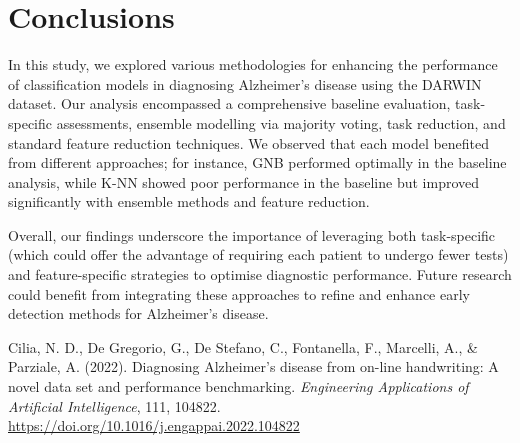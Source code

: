 \documentclass[a4paper, 11pt]{article}
\begin{document}
\section{Conclusions}
In this study, we explored various methodologies for enhancing the performance of classification models in diagnosing Alzheimer's disease using the DARWIN dataset. Our analysis encompassed a comprehensive baseline evaluation, task-specific assessments, ensemble modelling via majority voting, task reduction, and standard feature reduction techniques. We observed that each model benefited from different approaches; for instance, GNB performed optimally in the baseline analysis, while K-NN showed poor performance in the baseline but improved significantly with ensemble methods and feature reduction.

Overall, our findings underscore the importance of leveraging both task-specific (which could offer the advantage of requiring each patient to undergo fewer tests) and feature-specific strategies to optimise diagnostic performance.  Future research could benefit from integrating these approaches to refine and enhance early detection methods for Alzheimer's disease.

\begin{thebibliography}{99}
Cilia, N. D., De Gregorio, G., De Stefano, C., Fontanella, F., Marcelli, A., \& Parziale, A. (2022). Diagnosing Alzheimer’s disease from on-line handwriting: A novel data set and performance benchmarking. \textit{Engineering Applications of Artificial Intelligence}, 111, 104822. \url{https://doi.org/10.1016/j.engappai.2022.104822}
\end{thebibliography}
\end{document}

